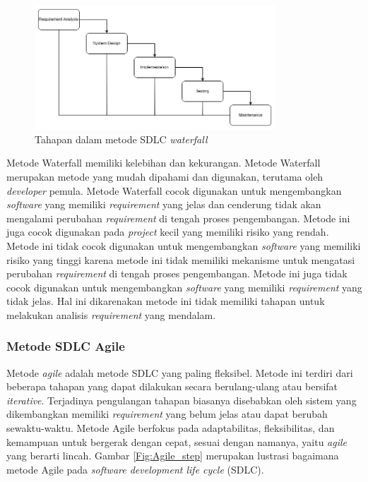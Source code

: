\begin{figure}[h]
	\centering
	\includegraphics[width=9cm]{contents/chapter-2/waterfall_fig.png}
	\caption{Tahapan dalam metode SDLC \textit{waterfall}}
	\label{Fig:Waterfall_step}
\end{figure}

Metode Waterfall memiliki kelebihan dan kekurangan. 
Metode Waterfall merupakan metode yang mudah dipahami dan digunakan, terutama oleh \textit{developer} 
pemula. 
Metode Waterfall cocok digunakan untuk mengembangkan \textit{software} yang memiliki 
\textit{requirement} yang jelas dan cenderung tidak akan mengalami perubahan \textit{requirement} 
di tengah proses pengembangan. Metode ini juga cocok digunakan pada \textit{project} kecil 
yang memiliki risiko yang rendah. Metode ini tidak cocok digunakan 
untuk mengembangkan \textit{software} yang memiliki risiko yang tinggi karena 
metode ini tidak memiliki mekanisme untuk mengatasi perubahan \textit{requirement} 
di tengah proses pengembangan. Metode ini juga tidak cocok digunakan untuk 
mengembangkan \textit{software} yang memiliki \textit{requirement} yang tidak jelas. 
Hal ini dikarenakan metode ini tidak memiliki tahapan untuk melakukan analisis 
\textit{requirement} yang mendalam. 

\subsubsection{Metode SDLC Agile}
Metode \textit{agile} adalah metode SDLC yang paling fleksibel. Metode ini terdiri dari 
beberapa tahapan yang dapat dilakukan secara berulang-ulang atau bersifat \textit{iterative}. 
Terjadinya pengulangan tahapan biasanya disebabkan oleh sistem yang dikembangkan memiliki 
\textit{requirement} yang belum jelas atau dapat berubah sewaktu-waktu. Metode Agile 
berfokus pada adaptabilitas, fleksibilitas, dan kemampuan untuk bergerak dengan cepat, sesuai dengan 
namanya, yaitu \textit{agile} yang berarti lincah. Gambar \ref{Fig:Agile_step} merupakan 
lustrasi bagaimana metode Agile pada \textit{software development life cycle} (SDLC).

